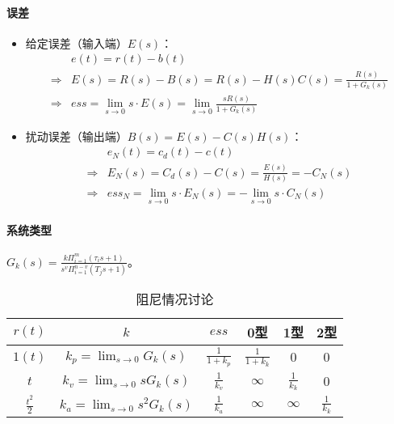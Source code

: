 \documentclass[
12pt, %
a4paper, 
oneside, %
headinclude,footinclude, %
]{scrartcl}
\begin{document}
\paragraph{误差}
\begin{itemize}
\item 给定误差（输入端）$ E(s) $：
\begin{align*}
&e(t) = r(t) - b(t) \\
\Rightarrow 
&E(s) = R(s) - B(s) = R(s) - H(s) C(s) = \frac{R(s)}{1 + G_k(s)} \\
\Rightarrow 
&ess = \lim_{s \to 0} s \cdot E(s) = \lim_{s \to 0} \frac{s R(s)}{1 + G_k(s)}
\end{align*}
\item 扰动误差（输出端）$ B(s) = E(s) - C(s) H(s) $：
\begin{align*}
&e_N(t) = c_d(t) - c(t) \\
\Rightarrow 
&E_N(s) = C_d(s) - C(s) = \frac{E(s)}{H(s)} = -C_N(s) \\
\Rightarrow 
&ess_N = \lim_{s \to 0} s \cdot E_N(s) = -\lim_{s \to 0} s \cdot C_N(s)
\end{align*}
\end{itemize}
\paragraph{系统类型}
$ G_k(s) = \frac{k \Pi_{i = 1}^m (\tau_i s + 1)}{s^v \Pi_{i = 1}^{n - v} (T_j s + 1)} $。

\begin{table}[H]
\centering
\begin{tabular}{|c|c|c|c|c|c|}
\hline
$ r(t) $ & $ k $ & $ ess $ & 0型 & 1型 & 2型 \\
\hline
$ 1(t) $ & $ k_p = \lim_{s \to 0} G_k(s) $ & $ \frac{1}{1 + k_p} $ & $ \frac{1}{1 + k_k} $ & $ 0 $ & $ 0 $ \\
\hline
$ t $ & $ k_v = \lim_{s \to 0} s G_k(s) $ & $ \frac{1}{k_v} $ & $ \infty $ & $ \frac{1}{k_k} $ & $ 0 $ \\
\hline
$ \frac{t^2}{2} $ & $ k_a = \lim_{s \to 0} s^2 G_k(s) $ & $ \frac{1}{k_a} $ & $ \infty $ & $ \infty $ & $ \frac{1}{k_k} $ \\
\hline
\end{tabular}
\caption{阻尼情况讨论}
\end{table}
\end{document}
